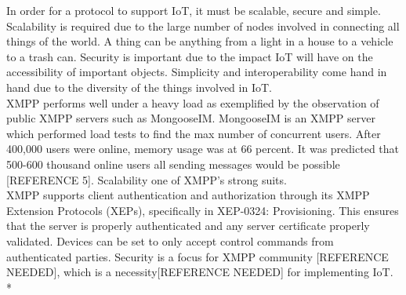 In order for a protocol to support IoT, it must be scalable, secure and simple. Scalability is required due to the large number of nodes involved in connecting all things of the world. A thing can be anything from a light in a house to a vehicle to a trash can. Security is important due to the impact IoT will have on the accessibility of important objects. Simplicity and interoperability come hand in hand due to the diversity of the things involved in IoT.\\
XMPP performs well under a heavy load as exemplified by the observation of public XMPP servers such as MongooseIM. MongooseIM is an XMPP server which performed load tests to find the max number of concurrent users. After 400,000 users were online, memory usage was at 66 percent. It was predicted that 500-600 thousand online users all sending messages would be possible [REFERENCE 5]. Scalability one of XMPP's strong suits.\\
XMPP supports client authentication and authorization through its XMPP Extension Protocols (XEPs), specifically in XEP-0324: Provisioning. This ensures that the server is properly authenticated and any server certificate properly validated. Devices can be set to only accept control commands from authenticated parties. Security is a focus for XMPP community [REFERENCE NEEDED], which is a necessity[REFERENCE NEEDED] for implementing IoT.\\*
